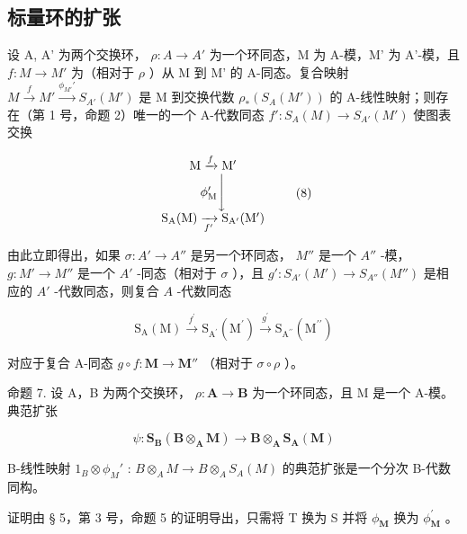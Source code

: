 \subsection{标量环的扩张}

设 A, A' 为两个交换环， \(\rho: A \to A'\) 为一个环同态，M 为 A-模，M' 为 A'-模，且 \(f: M \to M'\) 为（相对于 \(\rho\) ）从 M 到 M' 的 A-同态。复合映射 \(M \xrightarrow{f} M' \xrightarrow{\phi_{M'}'} S_{A'}(M')\) 是 M 到交换代数 \(\rho_*(S_A(M'))\) 的 A-线性映射；则存在（第 1 号，命题 2）唯一的一个 A-代数同态 \(f': S_A(M) \to S_{A'}(M')\) 使图表交换

\[
\begin{array}{c} \mathrm{M} \xrightarrow {f} \mathrm{M} ^ {\prime} \\ \phi_ {\mathrm{M}} ^ {\prime} \Biggl \downarrow \\ \mathrm{S} _ {\mathrm{A}} (\mathrm{M}) \xrightarrow [ f ^ {\prime} ]{} \mathrm{S} _ {\mathrm{A} ^ {\prime}} (\mathrm{M} ^ {\prime}) \end{array}\tag{8}
\]

由此立即得出，如果 \(\sigma: A' \to A''\) 是另一个环同态， \(M''\) 是一个 \(A''\) -模， \(g: M' \to M''\) 是一个 \(A'\) -同态（相对于 \(\sigma\) ），且 \(g': S_{A'}(M') \to S_{A''}(M'')\) 是相应的 \(A'\) -代数同态，则复合 \(A\) -代数同态

\[
\mathrm{S} _ {\mathrm{A}} (\mathrm{M}) \xrightarrow {f ^ {\prime}} \mathrm{S} _ {\mathrm{A} ^ {\prime}} \left(\mathrm{M} ^ {\prime}\right) \xrightarrow {g ^ {\prime}} \mathrm{S} _ {\mathrm{A} ^ {\prime \prime}} \left(\mathrm{M} ^ {\prime \prime}\right)\tag{9}
\]

对应于复合 A-同态 \(g \circ f: \mathbf{M} \to \mathbf{M}''\) （相对于 \(\sigma \circ \rho\) ）。

命题 7. 设 A，B 为两个交换环， \(\rho: \mathbf{A} \to \mathbf{B}\) 为一个环同态，且 M 是一个 A-模。典范扩张

\[
\psi \colon \mathbf {S} _ {\mathbf {B}} (\mathbf {B} \otimes_ {\mathbf {A}} \mathbf {M}) \rightarrow \mathbf {B} \otimes_ {\mathbf {A}} \mathbf {S} _ {\mathbf {A}} (\mathbf {M})
\]

B-线性映射 \(1_{B} \otimes \phi_{M}'\) : \(B \otimes_{A} M \to B \otimes_{A} S_{A}(M)\) 的典范扩张是一个分次 B-代数同构。

证明由 § 5，第 3 号，命题 5 的证明导出，只需将 T 换为 S 并将 \(\phi_{\mathbf{M}}\) 换为 \(\phi_{\mathbf{M}}^{\prime}\) 。

